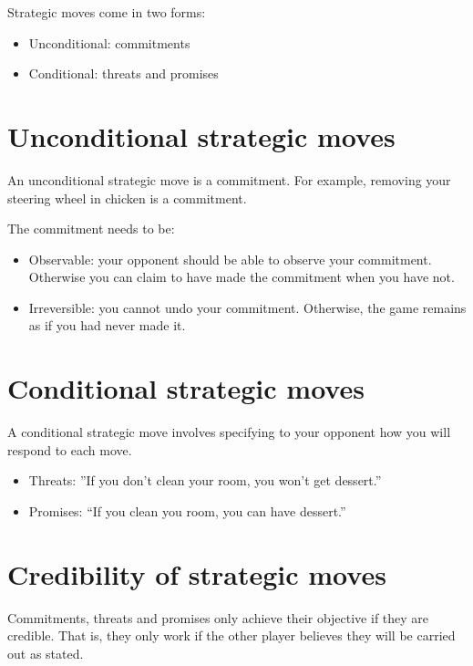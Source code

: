 \documentclass[
  letterpaper,
  DIV=11,
  numbers=noendperiod]{scrreprt}
\begin{document}
Strategic moves come in two forms:

\begin{itemize}
\item
  Unconditional: commitments
\item
  Conditional: threats and promises
\end{itemize}

\hypertarget{unconditional-strategic-moves}{%
\section{Unconditional strategic
moves}\label{unconditional-strategic-moves}}

An unconditional strategic move is a commitment. For example, removing
your steering wheel in chicken is a commitment.

The commitment needs to be:

\begin{itemize}
\item
  Observable: your opponent should be able to observe your commitment.
  Otherwise you can claim to have made the commitment when you have not.
\item
  Irreversible: you cannot undo your commitment. Otherwise, the game
  remains as if you had never made it.
\end{itemize}

\hypertarget{conditional-strategic-moves}{%
\section{Conditional strategic
moves}\label{conditional-strategic-moves}}

A conditional strategic move involves specifying to your opponent how
you will respond to each move.

\begin{itemize}
\item
  Threats: ''If you don't clean your room, you won't get dessert.''
\item
  Promises: ``If you clean you room, you can have dessert.''
\end{itemize}

\hypertarget{credibility-of-strategic-moves}{%
\section{Credibility of strategic
moves}\label{credibility-of-strategic-moves}}

Commitments, threats and promises only achieve their objective if they
are credible. That is, they only work if the other player believes they
will be carried out as stated.
\end{document}
